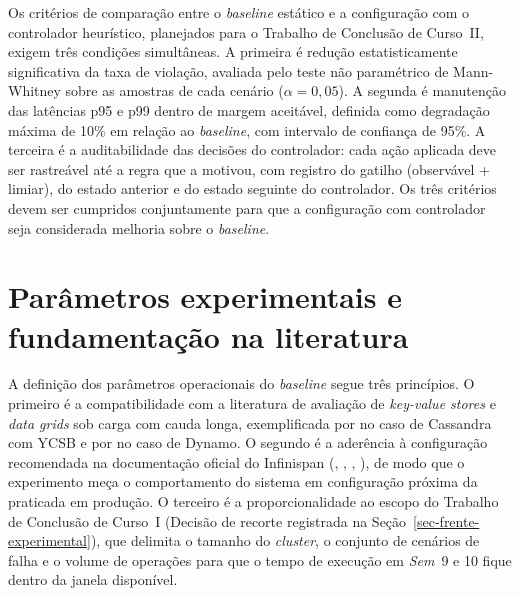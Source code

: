 Os critérios de comparação entre o \emph{baseline} estático e a configuração com o controlador heurístico, planejados para o Trabalho de Conclusão de Curso~II, exigem três condições simultâneas. A primeira é redução estatisticamente significativa da taxa de violação, avaliada pelo teste não paramétrico de Mann-Whitney sobre as amostras de cada cenário ($\alpha = 0{,}05$). A segunda é manutenção das latências p95 e p99 dentro de margem aceitável, definida como degradação máxima de 10\% em relação ao \emph{baseline}, com intervalo de confiança de 95\%. A terceira é a auditabilidade das decisões do controlador: cada ação aplicada deve ser rastreável até a regra que a motivou, com registro do gatilho (observável + limiar), do estado anterior e do estado seguinte do controlador. Os três critérios devem ser cumpridos conjuntamente para que a configuração com controlador seja considerada melhoria sobre o \emph{baseline}. 

\section*{Parâmetros experimentais e fundamentação na literatura}
\label{sec-parametros}

A definição dos parâmetros operacionais do \emph{baseline} segue três princípios. O primeiro é a compatibilidade com a literatura de avaliação de \emph{key-value stores} e \emph{data grids} sob carga com cauda longa, exemplificada por \citet{jaiman_tailx_2020} no caso de Cassandra com YCSB e por \citet{decandia_dynamo_2007} no caso de Dynamo. O segundo é a aderência à configuração recomendada na documentação oficial do Infinispan (\citeauthor{infinispan_docs_stable}, \citeyear{infinispan_docs_stable}, \citeyear{infinispan_metrics}, \citeyear{infinispan_tuning}), de modo que o experimento meça o comportamento do sistema em configuração próxima da praticada em produção. O terceiro é a proporcionalidade ao escopo do Trabalho de Conclusão de Curso~I (Decisão de recorte registrada na Seção~\ref{sec-frente-experimental}), que delimita o tamanho do \emph{cluster}, o conjunto de cenários de falha e o volume de operações para que o tempo de execução em \emph{Sem}~9 e 10 fique dentro da janela disponível.

